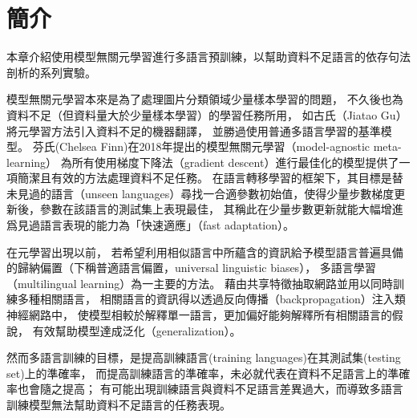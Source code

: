 \section{簡介}

\iffalse
有名的語言學家杭氏（Noam Chomsky）觀察人類習得語言的過程，
他認為嬰孩學習語言時所接收到的語言輸入是不足以讓他們習得該語言的所有特徵的，
許多特性相異的語法都可以產生這些他們所接收到的語料，
但孩童仍然習得了該語言的正確語法，
因此他推斷人類出生時大腦中即具備有某種語言習得裝置（Language acquisition device），
而語言習得裝置的任務便是從所有與語料匹配的語法中挑選正確的語法
\fi
本章介紹使用模型無關元學習進行多語言預訓練，以幫助資料不足語言的依存句法剖析的系列實驗。

模型無關元學習本來是為了處理圖片分類領域少量樣本學習的問題，
不久後也為資料不足（但資料量大於少量樣本學習）的學習任務所用，
如古氏（Jiatao Gu）將元學習方法引入資料不足的機器翻譯，
並勝過使用普通多語言學習的基準模型\cite{gu-etal-2018-meta}。
芬氏(Chelsea Finn)在2018年提出的模型無關元學習（model-agnostic meta-learning）
\cite{Finn2017ModelAgnosticMF}為所有使用梯度下降法（gradient descent）進行最佳化的模型提供了一項簡潔且有效的方法處理資料不足任務。
在語言轉移學習的框架下，其目標是替未見過的語言（unseen languages）尋找一合適參數初始值，使得少量步數梯度更新後，參數在該語言的測試集上表現最佳，
其稱此在少量步數更新就能大幅增進爲見過語言表現的能力為「快速適應」（fast adaptation）\cite{Finn2017ModelAgnosticMF}。

在元學習出現以前，
若希望利用相似語言中所蘊含的資訊給予模型語言普遍具備的歸納偏置（下稱普適語言偏置，universal linguistic biases），
多語言學習（multilingual learning）為一主要的方法\cite{caruana1997multitask}。
藉由共享特徵抽取網路並用以同時訓練多種相關語言，
相關語言的資訊得以透過反向傳播（backpropagation）注入類神經網路中，
使模型相較於解釋單一語言，更加偏好能夠解釋所有相關語言的假說，
有效幫助模型達成泛化（generalization）。

然而多語言訓練的目標，是提高訓練語言(training languages)在其測試集(testing set)上的準確率，
而提高訓練語言的準確率，未必就代表在資料不足語言上的準確率也會隨之提高；
有可能出現訓練語言與資料不足語言差異過大，而導致多語言訓練模型無法幫助資料不足語言的任務表現。

